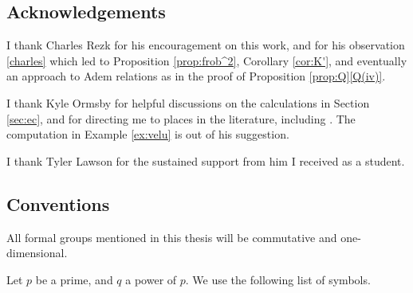 \documentclass{gtpart}
\theoremstyle{definition}
\theoremstyle{remark}
\newcommand{\q}[1]{Proposition \ref{prop:Q}\thinspace \eqref{Q(#1)}}
\numberwithin{equation}{section}
\numberwithin{thm}{section}
\begin{document}
\subsection{Acknowledgements}

I thank Charles Rezk for his encouragement on this work, and for his 
observation \eqref{charles} which led to Proposition \ref{prop:frob^2}, 
Corollary \ref{cor:K'}, and eventually an approach to Adem relations as 
in the proof of \q{iv}.  

I thank Kyle Ormsby for helpful discussions on the calculations in 
Section \ref{sec:ec}, and for directing me to places in the literature, 
including \cite{kohel}.  The computation in Example \ref{ex:velu} is out 
of his suggestion.  

I thank Tyler Lawson for the sustained support from him I received as a 
student.  


\subsection{Conventions}

All formal groups mentioned in this thesis will be commutative and 
one-dimensional.  

Let $p$ be a prime, and $q$ a power of $p$.  We use the following list 
of symbols.  
\end{document}
